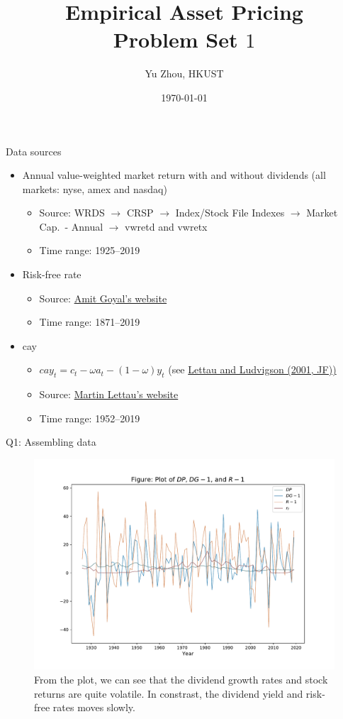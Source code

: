 \documentclass[10pt,t]{beamer}
\title{Empirical Asset Pricing \\ Problem Set $1$}
\author{Yu Zhou, HKUST}
\date{\today}
\begin{document}
\maketitle

\begin{frame}{Data sources}
\begin{itemize}
  \item Annual value-weighted market return with and without dividends (all markets: nyse, amex and nasdaq)
  \begin{itemize}
    \item Source: WRDS $\rightarrow$ CRSP $\rightarrow$ Index/Stock File Indexes $\rightarrow$ Market Cap.~- Annual $\rightarrow$ vwretd and vwretx
    \item Time range: 1925--2019
  \end{itemize}
  \item Risk-free rate
  \begin{itemize}
    \item Source: \href{http://www.hec.unil.ch/agoyal/docs/PredictorData2019.xlsx}{Amit Goyal's website}
    \item Time range: 1871--2019
  \end{itemize}
  \item cay
  \begin{itemize}
    \item $cay_t = c_t - \omega a_t - (1 - \omega) y_t$ (see \href{https://onlinelibrary.wiley.com/doi/full/10.1111/0022-1082.00347}{Lettau and Ludvigson (2001, JF))}
    \item Source: \href{https://sites.google.com/view/martinlettau/data}{Martin Lettau's website}
    \item Time range: 1952--2019
  \end{itemize}
\end{itemize}
\end{frame}



\begin{frame}{Q1: Assembling data}
\begin{figure}[h!]
\centering
\includegraphics[width=0.8\linewidth]{q1fig1.pdf}
\caption{From the plot, we can see that the dividend growth rates and stock returns are quite volatile. In constrast, the dividend yield and risk-free rates moves slowly.}
\end{figure}
\end{frame}
\end{document}
